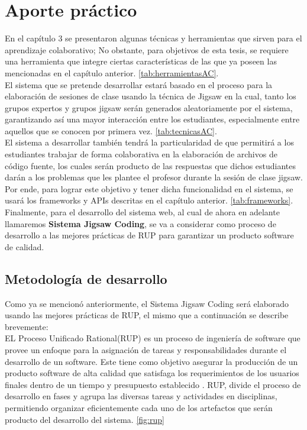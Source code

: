 \chapter{Aporte práctico}
\label{cap:aporte_practico}
En el capítulo 3 se presentaron algunas técnicas y herramientas que sirven para el aprendizaje colaborativo; No obstante, para objetivos de esta tesis, se requiere una herramienta que integre ciertas características de las que ya poseen las mencionadas en el capítulo anterior.  \autoref{tab:herramientasAC}.\\

El sistema que se pretende desarrollar estará basado en el proceso para la elaboración de sesiones de clase usando la técnica de Jigsaw en la cual, tanto los grupos expertos y grupos jigsaw serán generados aleatoriamente por el sistema, garantizando así una mayor interacción entre los estudiantes, especialmente entre aquellos que se conocen por primera vez. \autoref{tab:tecnicasAC}.\\

El sistema a desarrollar también tendrá la particularidad de que permitirá a los estudiantes trabajar de forma colaborativa en la elaboración de archivos de código fuente, los cuales serán producto de las respuestas que dichos estudiantes darán a los problemas que les plantee el profesor durante la sesión de clase jigsaw. Por ende, para lograr este objetivo y tener dicha funcionalidad en el sistema, se usará los frameworks y APIs descritas en el capítulo anterior.  \autoref{tab:frameworks}.\\

Finalmente, para el desarrollo del sistema web, al cual de ahora en adelante llamaremos \textbf{Sistema Jigsaw Coding}, se va a considerar como proceso de desarrollo a las mejores prácticas de RUP para garantizar un producto software de calidad.

\section{Metodología de desarrollo}
Como ya se mencionó anteriormente, el Sistema Jigsaw Coding será elaborado usando las mejores prácticas de RUP, el mismo que a continuación se describe brevemente:\\

EL Proceso Unificado Rational(RUP) es un proceso de ingeniería de software que provee un enfoque para la asignación de tareas y responsabilidades durante el desarrollo de un software. Este tiene como objetivo asegurar la producción de un producto software de alta calidad que satisfaga los requerimientos de los usuarios finales dentro de un tiempo y presupuesto establecido \cite{rup_ibm_2014}. RUP, divide el proceso de desarrollo en fases y agrupa las diversas tareas y actividades en disciplinas, permitiendo organizar eficientemente cada uno de los artefactos que serán producto del desarrollo del sistema. \autoref{fig:rup}\\

